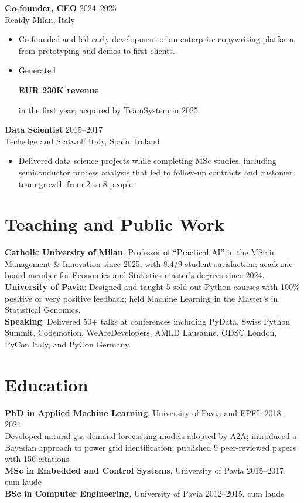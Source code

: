\documentclass[10pt,a4paper]{article}
\newcommand{\entry}[4]{%
  \textbf{#1} \hfill #2\\
  {\color{textgray}#3 \hfill #4}\par
}
\newcommand{\metric}[1]{\colorbox{softaccent}{\strut\textbf{#1}}}
\begin{document}
\entry{Co-founder, CEO}{2024--2025}{Reaidy}{Milan, Italy}
\begin{itemize}
  \item Co-founded and led early development of an enterprise copywriting platform, from pretotyping and demos to first clients.
  \item Generated \metric{EUR 230K revenue} in the first year; acquired by TeamSystem in 2025.
\end{itemize}

\entry{Data Scientist}{2015--2017}{Techedge and Statwolf}{Italy, Spain, Ireland}
\begin{itemize}
  \item Delivered data science projects while completing MSc studies, including semiconductor process analysis that led to follow-up contracts and customer team growth from 2 to 8 people.
\end{itemize}

\section*{Teaching and Public Work}
\textbf{Catholic University of Milan}: Professor of ``Practical AI'' in the MSc in Management \& Innovation since 2025, with 8.4/9 student satisfaction; academic board member for Economics and Statistics master's degrees since 2024.\\
\textbf{University of Pavia}: Designed and taught 5 sold-out Python courses with 100\% positive or very positive feedback; held Machine Learning in the Master's in Statistical Genomics.\\
\textbf{Speaking}: Delivered 50+ talks at conferences including PyData, Swiss Python Summit, Codemotion, WeAreDevelopers, AMLD Lausanne, ODSC London, PyCon Italy, and PyCon Germany.

\section*{Education}
\textbf{PhD in Applied Machine Learning}, University of Pavia and EPFL \hfill 2018--2021\\
Developed natural gas demand forecasting models adopted by A2A; introduced a Bayesian approach to power grid identification; published 9 peer-reviewed papers with 156 citations.\\
\textbf{MSc in Embedded and Control Systems}, University of Pavia \hfill 2015--2017, cum laude\\
\textbf{BSc in Computer Engineering}, University of Pavia \hfill 2012--2015, cum laude
\end{document}
